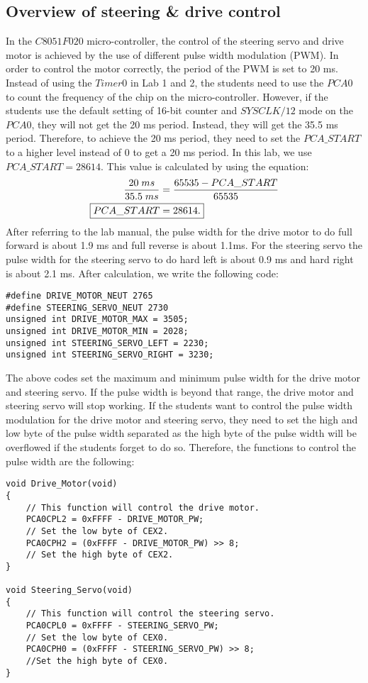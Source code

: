 \documentclass[12pt]{article}
\begin{document}
\subsection{Overview of steering \& drive control}
In the $C8051F020$ micro-controller, the control of the steering servo and drive motor is achieved by the use of different pulse width modulation (PWM). In order to control the motor correctly, the period of the PWM is set to 20 ms. Instead of using the $Timer0$ in Lab 1 and 2, the students need to use the $PCA0$ to count the frequency of the chip on the micro-controller. However, if the students use the default setting of 16-bit counter and $SYSCLK/12$ mode on the $PCA0$, they will not get the 20 ms period. Instead, they will get the 35.5 ms period. Therefore, to achieve the 20 ms period, they need to set the $PCA\_START$ to a higher level instead of 0 to get a 20 ms period. In this lab, we use $PCA\_START = 28614.$ This value is calculated by using the equation:
\begin{align*}
\frac{20\;ms}{35.5\;ms} &= \frac{65535-PCA\_START}{65535}\\
\Aboxed{PCA\_START &= 28614.}
\end{align*}
After referring to the lab manual, the pulse width for the drive motor to do full forward is about 1.9 ms and full reverse is about 1.1ms. For the steering servo the pulse width for the steering servo to do hard left is about 0.9 ms and hard right is about 2.1 ms. After calculation, we write the following code:
\begin{lstlisting}
#define DRIVE_MOTOR_NEUT 2765
#define STEERING_SERVO_NEUT 2730
unsigned int DRIVE_MOTOR_MAX = 3505;
unsigned int DRIVE_MOTOR_MIN = 2028;
unsigned int STEERING_SERVO_LEFT = 2230;
unsigned int STEERING_SERVO_RIGHT = 3230;
\end{lstlisting}
The above codes set the maximum and minimum pulse width for the drive motor and steering servo. If the pulse width is beyond that range, the drive motor and steering servo will stop working. If the students want to control the pulse width modulation for the drive motor and steering servo, they need to set the high and low byte of the pulse width separated as the high byte of the pulse width will be overflowed if the students forget to do so. Therefore, the functions to control the pulse width are the following:
\begin{lstlisting}
void Drive_Motor(void)
{
    // This function will control the drive motor.
    PCA0CPL2 = 0xFFFF - DRIVE_MOTOR_PW;
    // Set the low byte of CEX2.
    PCA0CPH2 = (0xFFFF - DRIVE_MOTOR_PW) >> 8;
    // Set the high byte of CEX2.
}

void Steering_Servo(void)
{
    // This function will control the steering servo.
    PCA0CPL0 = 0xFFFF - STEERING_SERVO_PW;
    // Set the low byte of CEX0.
    PCA0CPH0 = (0xFFFF - STEERING_SERVO_PW) >> 8;
    //Set the high byte of CEX0.
}
\end{lstlisting}
\end{document}
